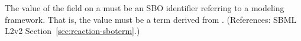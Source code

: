 The value of the  field on a \Reaction must be an SBO
identifier referring to a modeling framework.  That is, the value must
be a term derived from \sboframework.  (References: SBML L2v2
Section~\ref{sec:reaction-sboterm}.)
